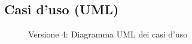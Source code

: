 \subsection{Casi d'uso (UML)}
\vspace{0.5cm}
\begin{figure}[H]
    \centering
    \caption{Versione 4: Diagramma UML dei casi d'uso}
    \label{fig:use_case_uml_v4}
\end{figure}
